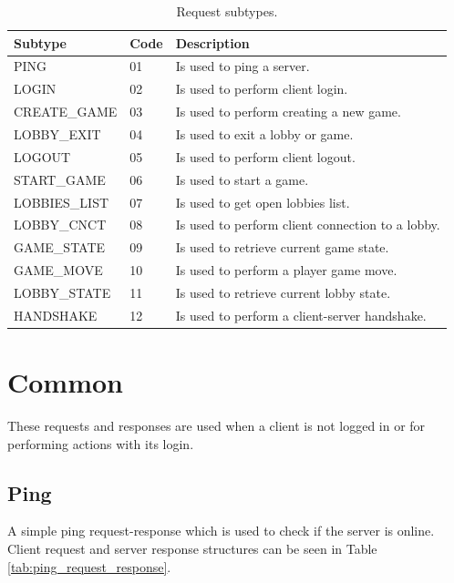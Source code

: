\documentclass[english, sem, kiv, he, iso690alph, pdf, viewonly]{fasthesis}
\begin{document}
\begin{table}[h!]
	\centering
	\begin{tabular}{|l|l|l|}
		\hline
		\textbf{Subtype} & \textbf{Code} & \textbf{Description} \\ \hline
		PING & 01 & Is used to ping a server. \\ \hline
		LOGIN & 02 & Is used to perform client login. \\ \hline
		CREATE\_GAME & 03 & Is used to perform creating a new game. \\ \hline
		LOBBY\_EXIT & 04 & Is used to exit a lobby or game. \\ \hline
		LOGOUT & 05 & Is used to perform client logout. \\ \hline
		START\_GAME & 06 & Is used to start a game. \\ \hline
		LOBBIES\_LIST & 07 & Is used to get open lobbies list. \\ \hline
		LOBBY\_CNCT & 08 & Is used to perform client connection to a lobby. \\ \hline
		GAME\_STATE & 09 & Is used to retrieve current game state. \\ \hline
		GAME\_MOVE & 10 & Is used to perform a player game move. \\ \hline
		LOBBY\_STATE & 11 & Is used to retrieve current lobby state. \\ \hline
		HANDSHAKE & 12 & Is used to perform a client-server handshake. \\ \hline
	\end{tabular}
	\caption{Request subtypes.}
	\label{tab:request_subtypes}
\end{table}


\section{Common}
These requests and responses are used when a client is not logged in or for performing actions with its login.

\subsection{Ping}
A simple ping request-response which is used to check if the server is online. Client request and server response structures can be seen in Table \ref{tab:ping_request_response}.
\end{document}
